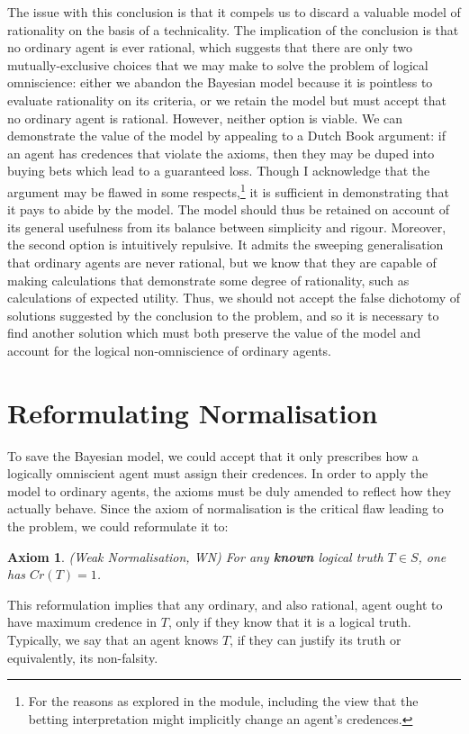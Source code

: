 \documentclass[12pt]{article}
\newtheorem{axiom}{Axiom}
\begin{document}
The issue with this conclusion is that it compels us to discard a valuable model of rationality on the basis of a technicality. The implication of the conclusion is that no ordinary agent is ever rational, which suggests that there are only two mutually-exclusive choices that we may make to solve the problem of logical omniscience: either we abandon the Bayesian model because it is pointless to evaluate rationality on its criteria, or we retain the model but must accept that no ordinary agent is rational. However, neither option is viable. We can demonstrate the value of the model by appealing to a Dutch Book argument: if an agent has credences that violate the axioms, then they may be duped into buying bets which lead to a guaranteed loss.\autocite[44]{bdrc} Though I acknowledge that the argument may be flawed in some respects,\footnote{For the reasons as explored in the module, including the view that the betting interpretation might implicitly change an agent's credences.} it is sufficient in demonstrating that it pays to abide by the model. The model should thus be retained on account of its general usefulness from its balance between simplicity and rigour. Moreover, the second option is intuitively repulsive. It admits the sweeping generalisation that ordinary agents are never rational, but we know that they are capable of making calculations that demonstrate some degree of rationality, such as calculations of expected utility. Thus, we should not accept the false dichotomy of solutions suggested by the conclusion to the problem, and so it is necessary to find another solution which must both preserve the value of the model and account for the logical non-omniscience of ordinary agents.

\section{Reformulating Normalisation}
To save the Bayesian model, we could accept that it only prescribes how a logically omniscient agent must assign their credences. In order to apply the model to ordinary agents, the axioms must be duly amended to reflect how they actually behave. Since the axiom of normalisation is the critical flaw leading to the problem, we could reformulate it to:
\begin{axiom}
    (Weak Normalisation, WN) For any \textbf{known} logical truth $T\in S$, one has $Cr(T)=1$.
\end{axiom}
This reformulation implies that any ordinary, and also rational, agent ought to have maximum credence in $T$, only if they know that it is a logical truth.\autocite{sep} Typically, we say that an agent knows $T$, if they can justify its truth or equivalently, its non-falsity.
\end{document}
